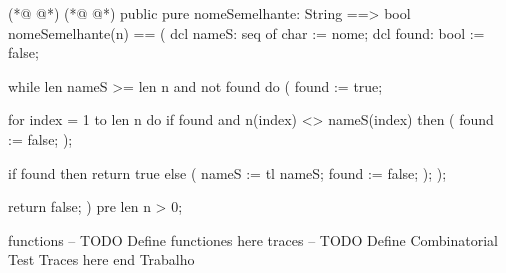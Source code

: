 \begin{vdmpp}[breaklines=true]
(*@
\label{similarName:172}
@*)
(*@
\label{nomeSemelhante:172}
@*)
 public pure nomeSemelhante: String ==> bool
 nomeSemelhante(n) == (
  dcl nameS: seq of char := nome;
  dcl found: bool := false;
  
  while len nameS >= len n and not found do (
   found := true;
 
   for index = 1 to len n do
    if found and n(index) <> nameS(index) then (
     found := false;
    );
   
   if found then
    return true
   else (
    nameS := tl nameS;
    found := false;
   );
  );
   
  return false;
 )
 pre len n > 0;
  
functions
-- TODO Define functiones here
traces
-- TODO Define Combinatorial Test Traces here
end Trabalho
\end{vdmpp}
\bigskip
